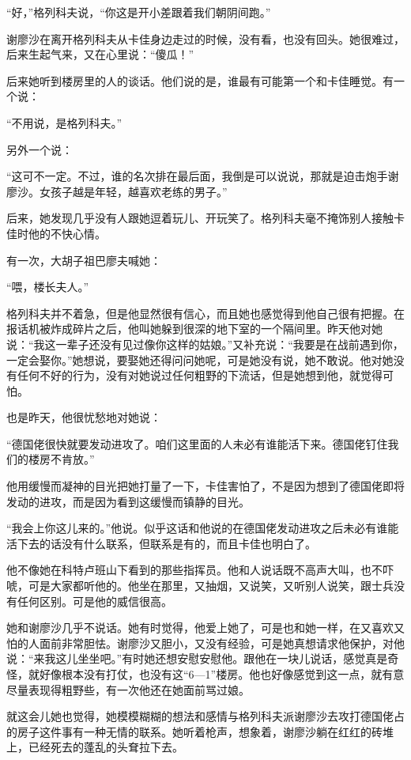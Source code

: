 “好，”格列科夫说，“你这是开小差跟着我们朝阴间跑。”

谢廖沙在离开格列科夫从卡佳身边走过的时候，没有看，也没有回头。她很难过，后来生起气来，又在心里说：“傻瓜！”

后来她听到楼房里的人的谈话。他们说的是，谁最有可能第一个和卡佳睡觉。有一个说：

“不用说，是格列科夫。”

另外一个说：

“这可不一定。不过，谁的名次排在最后面，我倒是可以说说，那就是迫击炮手谢廖沙。女孩子越是年轻，越喜欢老练的男子。”

后来，她发现几乎没有人跟她逗着玩儿、开玩笑了。格列科夫毫不掩饰别人接触卡佳时他的不快心情。

有一次，大胡子祖巴廖夫喊她：

“喂，楼长夫人。”

格列科夫并不着急，但是他显然很有信心，而且她也感觉得到他自己很有把握。在报话机被炸成碎片之后，他叫她躲到很深的地下室的一个隔间里。昨天他对她说：“我这一辈子还没有见过像你这样的姑娘。”又补充说：“我要是在战前遇到你，一定会娶你。”她想说，要娶她还得问问她呢，可是她没有说，她不敢说。他对她没有任何不好的行为，没有对她说过任何粗野的下流话，但是她想到他，就觉得可怕。

也是昨天，他很忧愁地对她说：

“德国佬很快就要发动进攻了。咱们这里面的人未必有谁能活下来。德国佬钉住我们的楼房不肯放。”

他用缓慢而凝神的目光把她打量了一下，卡佳害怕了，不是因为想到了德国佬即将发动的进攻，而是因为看到这缓慢而镇静的目光。

“我会上你这儿来的。”他说。似乎这话和他说的在德国佬发动进攻之后未必有谁能活下去的话没有什么联系，但联系是有的，而且卡佳也明白了。

他不像她在科特卢班山下看到的那些指挥员。他和人说话既不高声大叫，也不吓唬，可是大家都听他的。他坐在那里，又抽烟，又说笑，又听别人说笑，跟士兵没有任何区别。可是他的威信很高。

她和谢廖沙几乎不说话。她有时觉得，他爱上她了，可是也和她一样，在又喜欢又怕的人面前非常胆怯。谢廖沙又胆小，又没有经验，可是她真想请求他保护，对他说：“来我这儿坐坐吧。”有时她还想安慰安慰他。跟他在一块儿说话，感觉真是奇怪，就好像根本没有打仗，也没有这“6—1”楼房。他也好像感觉到这一点，就有意尽量表现得粗野些，有一次他还在她面前骂过娘。

就这会儿她也觉得，她模模糊糊的想法和感情与格列科夫派谢廖沙去攻打德国佬占的房子这件事有一种无情的联系。她听着枪声，想象着，谢廖沙躺在红红的砖堆上，已经死去的蓬乱的头耷拉下去。

